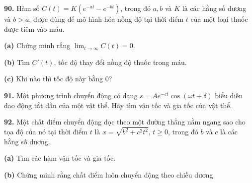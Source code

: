 \begin{minipage}[t]{0.485\textwidth}
    \par\medskip
    \noindent\textbf{90.} Hàm số $C(t) = K(e^{-at} - e^{-bt})$, trong đó $a, b$ và $K$ là các hằng số dương và $b > a$, được dùng để mô hình hóa nồng độ tại thời điểm $t$ của một loại thuốc được tiêm vào máu.
    \par\smallskip
    \noindent\hspace*{1.4em}\textbf{(a)} Chứng minh rằng $\lim_{t \to \infty} C(t) = 0$.
    \par\smallskip
    \noindent\hspace*{1.4em}\textbf{(b)} Tìm $C'(t)$, tốc độ thay đổi nồng độ thuốc trong máu.
    \par\smallskip
    \noindent\hspace*{1.4em}\textbf{(c)} Khi nào thì tốc độ này bằng 0?

    \par\medskip
    \noindent\textbf{91.} Một phương trình chuyển động có dạng $s = Ae^{-ct} \cos(\omega t + \delta)$ biểu diễn dao động tắt dần của một vật thể. Hãy tìm vận tốc và gia tốc của vật thể.

    \par\medskip
    \noindent\textbf{92.} Một chất điểm chuyển động dọc theo một đường thẳng nằm ngang sao cho tọa độ của nó tại thời điểm $t$ là $x = \sqrt{b^2 + c^2 t^2}$, $t \geqslant 0$, trong đó $b$ và $c$ là các hằng số dương.
    \par\smallskip
    \noindent\hspace*{1.4em}\textbf{(a)} Tìm các hàm vận tốc và gia tốc.
    \par\smallskip
    \noindent\hspace*{1.4em}\textbf{(b)} Chứng minh rằng chất điểm luôn chuyển động theo chiều dương.
\end{minipage}

\vfill
{}
